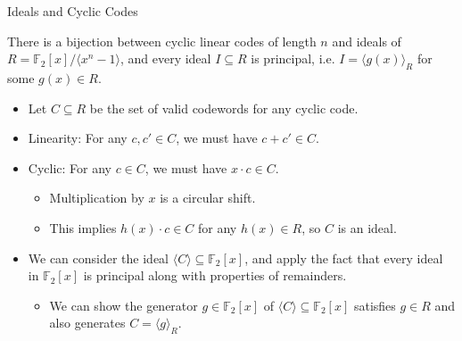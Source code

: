\documentclass[handout]{beamer}
\newcommand{\F}{\mathbb{F}}
\begin{document}
\begin{frame}{Ideals and Cyclic Codes}

    \begin{theorem}
        There is a bijection between cyclic linear codes of length $n$ and ideals of $R = \F_2[x]/\langle x^n - 1\rangle$, and every ideal $I \subseteq R$ is principal, i.e. $I = \langle g(x)\rangle_R$ for some $g(x) \in R$.
    \end{theorem}

    \begin{itemize}
        \item Let $C \subseteq R$ be the set of valid codewords for any cyclic code.
        \item Linearity: For any $c, c' \in C$, we must have $c+c' \in C$.
        \item Cyclic: For any $c \in C$, we must have $x \cdot c \in C$.
        \begin{itemize}
            \item Multiplication by $x$ is a circular shift.
            \item This implies $h(x) \cdot c \in C$ for any $h(x) \in R$, so $C$ is an ideal.
        \end{itemize}
        \item We can consider the ideal $\langle C \rangle \subseteq \mathbb F_2[x]$, and apply the fact that every ideal in $\mathbb F_2[x]$ is principal along with properties of remainders.
        \begin{itemize}
            \item We can show the generator $g \in \mathbb F_2[x]$ of $\langle C \rangle \subseteq \mathbb F_2[x]$ satisfies $g \in R$ and also generates $C = \langle g\rangle_R$.
        \end{itemize}
    \end{itemize}
\end{frame}
\end{document}
